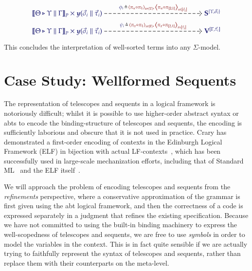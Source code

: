 \documentclass[11pt]{article}
\theoremstyle{definition}
\theoremstyle{remark}
\numberwithin{equation}{section}
\begin{document}
\begin{gather*}
  \begin{tikzcd}[cramped, ampersand replacement = \&]
    {\IMode{
      {\SemBrackets{\Theta\triangleright\Upsilon\parallel\Gamma}}_{P}
      \times
      \Yoneda{\vec{\sigma}_i\parallel\vec{\tau}_i}
    }}
      \arrow[
        , r
        , dashed
        , "
          \Define
            {
              \phi_i\,
            }
            {
              \,
                \Tuple{\pi_u\circ\pi_1}_{u\in\Dom{\Upsilon}}
              ,
                \,\Tuple{\pi_u\circ\pi_{[2,1]}}_{u\in\Dom{\vec{\sigma}_i}}
            }
          "
      ]
\&[12.0em]
    {\IMode{\SymPsh^{\{\Upsilon,\vec{\sigma}_i\}}}}
\\[-1.0em]
    {\IMode{
      {\SemBrackets{
        \Theta\triangleright\Upsilon\parallel\Gamma
      }}_{P}
      \times
      \Yoneda{\vec{\sigma}_i\parallel\vec{\tau}_i}
    }}
      \arrow[
        , r
        , dashed
        , "
          \Define{
            \psi_i\,
          }{
            \,
              \Tuple{\pi_x\circ\pi_1}_{x\in\Dom{\Gamma}}
            ,
              \,\Tuple{\pi_x\circ\pi_{[2,1]}}_{x\in\Dom{\vec{\tau}_i}}
          }
          "
      ]
\&[12.0em]
    {\IMode{\VarPsh^{[\Gamma,\vec{\tau}_i]}}}
  \end{tikzcd}
\end{gather*}

This concludes the interpretation of well-sorted terms into any $\Sigma$-model.

\section{Case Study: Wellformed Sequents}

The representation of telescopes and sequents in a logical framework is
notoriously difficult; whilst it is possible to use higher-order abstract
syntax or abts to encode the binding-structure of telescopes and sequents, the
encoding is sufficiently laborious and obscure that it is not used in practice.
Crary has demonstrated a first-order encoding of contexts in the Edinburgh
Logical Framework (ELF) in bijection with actual LF-contexts~\cite{crary:2009},
which has been successfully used in large-scale mechanization efforts,
including that of Standard ML~\cite{lee-crary-harper:2007} and the ELF
itself~\cite{martens-crary:2012}.

We will approach the problem of encoding telescopes and sequents from the
\emph{refinements} perspective, where a conservative approximation of the
grammar is first given using the abt logical framework, and then the
correctness of a code is expressed separately in a judgment that refines the
existing specification.  Because we have not committed to using the built-in
binding machinery to express the well-scopedness of telescopes and sequents, we
are free to use \emph{symbols} in order to model the variables in the context.
This is in fact quite sensible if we are actually trying to faithfully
represent the syntax of telescopes and sequents, rather than replace them with
their counterparts on the meta-level.
\end{document}
